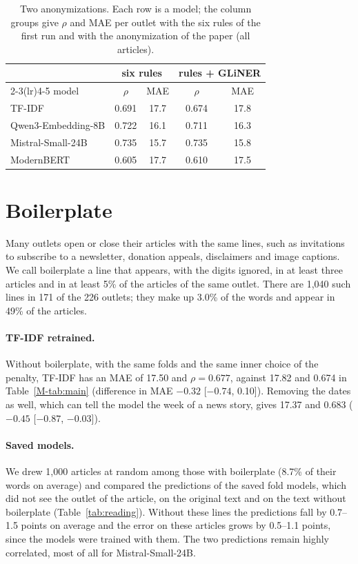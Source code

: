 \documentclass[11pt,a4paper]{article}
\begin{document}
\begin{table}[h]
\centering
\caption{Two anonymizations. Each row is a model; the column groups give $\rho$ and MAE per outlet with the six rules of
the first run and with the anonymization of the paper (all articles).}\label{tab:anon}
\begin{tabular}{lcccc}
\toprule
& \multicolumn{2}{c}{six rules} & \multicolumn{2}{c}{rules + GLiNER} \\
\cmidrule(lr){2-3}\cmidrule(lr){4-5}
model & $\rho$ & MAE & $\rho$ & MAE \\
\midrule
TF-IDF & 0.691 & 17.7 & 0.674 & 17.8 \\
Qwen3-Embedding-8B & 0.722 & 16.1 & 0.711 & 16.3 \\
Mistral-Small-24B & 0.735 & 15.7 & 0.735 & 15.8 \\
ModernBERT & 0.605 & 17.7 & 0.610 & 17.5 \\
\bottomrule
\end{tabular}
\end{table}

\section{Boilerplate}\label{app:reading}
Many outlets open or close their articles with the same lines, such as invitations to subscribe to a newsletter,
donation appeals, disclaimers and image captions. We call boilerplate a line that appears, with the digits ignored, in
at least three articles and in at least 5\% of the articles of the same outlet. There are 1,040 such lines in 171 of the
226 outlets; they make up 3.0\% of the words and appear in 49\% of the articles.

\paragraph{TF-IDF retrained.} Without boilerplate, with the same folds and the same inner choice of the penalty, TF-IDF
has an MAE of 17.50 and $\rho = 0.677$, against 17.82 and 0.674 in Table~\ref{M-tab:main} (difference in MAE $-0.32$
[$-0.74$, 0.10]). Removing the dates as well, which can tell the model the week of a news story, gives 17.37 and 0.683
($-0.45$ [$-0.87$, $-0.03$]).

\paragraph{Saved models.} We drew 1,000 articles at random among those with boilerplate (8.7\% of their words on
average) and compared the predictions of the saved fold models, which did not see the outlet of the article, on the
original text and on the text without boilerplate (Table~\ref{tab:reading}). Without these lines the predictions fall
by 0.7--1.5 points on average and the error on these articles grows by 0.5--1.1 points, since the models were trained
with them. The two predictions remain highly correlated, most of all for Mistral-Small-24B.
\end{document}
